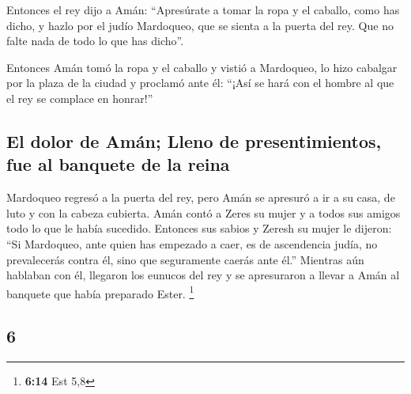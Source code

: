 \begin{paracol}{2}
 Entonces el rey dijo a Amán: ``Apresúrate a tomar la
ropa y el caballo, como has dicho, y hazlo por el judío Mardoqueo, que
se sienta a la puerta del rey. Que no falte nada de todo lo que has
dicho''.

 Entonces Amán tomó la ropa y el caballo y vistió a
Mardoqueo, lo hizo cabalgar por la plaza de la ciudad y proclamó ante
él: ``¡Así se hará con el hombre al que el rey se complace en honrar!''

\hypertarget{el-dolor-de-amuxe1n-lleno-de-presentimientos-fue-al-banquete-de-la-reina}{%
\subsection{El dolor de Amán; Lleno de presentimientos, fue al banquete
de la
reina}\label{el-dolor-de-amuxe1n-lleno-de-presentimientos-fue-al-banquete-de-la-reina}}

 Mardoqueo regresó a la puerta del rey, pero Amán se
apresuró a ir a su casa, de luto y con la cabeza cubierta.
 Amán contó a Zeres su mujer y a todos sus amigos todo lo
que le había sucedido. Entonces sus sabios y Zeresh su mujer le dijeron:
``Si Mardoqueo, ante quien has empezado a caer, es de ascendencia judía,
no prevalecerás contra él, sino que seguramente caerás ante él.''
 Mientras aún hablaban con él, llegaron los eunucos del
rey y se apresuraron a llevar a Amán al banquete que había preparado
Ester. \footnote{\textbf{6:14} Est 5,8}

\switchcolumn
\begin{otherlanguage}{english}

\hypertarget{section-11}{%
\section{6}\label{section-11}}


\end{otherlanguage}
\end{paracol}
